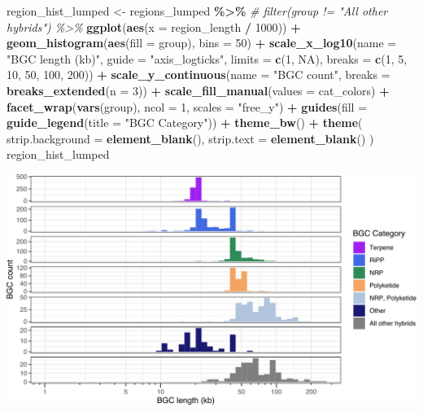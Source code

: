 \documentclass[
]{article}
\newenvironment{Shaded}{\begin{snugshade}}{\end{snugshade}}
\newcommand{\AttributeTok}[1]{\textcolor[rgb]{0.13,0.29,0.53}{#1}}
\newcommand{\CommentTok}[1]{\textcolor[rgb]{0.56,0.35,0.01}{\textit{#1}}}
\newcommand{\ConstantTok}[1]{\textcolor[rgb]{0.56,0.35,0.01}{#1}}
\newcommand{\DecValTok}[1]{\textcolor[rgb]{0.00,0.00,0.81}{#1}}
\newcommand{\FunctionTok}[1]{\textcolor[rgb]{0.13,0.29,0.53}{\textbf{#1}}}
\newcommand{\NormalTok}[1]{#1}
\newcommand{\OtherTok}[1]{\textcolor[rgb]{0.56,0.35,0.01}{#1}}
\newcommand{\SpecialCharTok}[1]{\textcolor[rgb]{0.81,0.36,0.00}{\textbf{#1}}}
\newcommand{\StringTok}[1]{\textcolor[rgb]{0.31,0.60,0.02}{#1}}
\begin{document}
\begin{Shaded}
\begin{Highlighting}[]
\NormalTok{region\_hist\_lumped }\OtherTok{\textless{}{-}}\NormalTok{ regions\_lumped }\SpecialCharTok{\%\textgreater{}\%}
  \CommentTok{\# filter(group != "All other hybrids") \%\textgreater{}\%}
  \FunctionTok{ggplot}\NormalTok{(}\FunctionTok{aes}\NormalTok{(}\AttributeTok{x =}\NormalTok{ region\_length }\SpecialCharTok{/} \DecValTok{1000}\NormalTok{)) }\SpecialCharTok{+}
  \FunctionTok{geom\_histogram}\NormalTok{(}\FunctionTok{aes}\NormalTok{(}\AttributeTok{fill =}\NormalTok{ group), }\AttributeTok{bins =} \DecValTok{50}\NormalTok{) }\SpecialCharTok{+}
  \FunctionTok{scale\_x\_log10}\NormalTok{(}\AttributeTok{name =} \StringTok{"BGC length (kb)"}\NormalTok{, }\AttributeTok{guide =} \StringTok{"axis\_logticks"}\NormalTok{, }\AttributeTok{limits =} \FunctionTok{c}\NormalTok{(}\DecValTok{1}\NormalTok{, }\ConstantTok{NA}\NormalTok{), }\AttributeTok{breaks =} \FunctionTok{c}\NormalTok{(}\DecValTok{1}\NormalTok{, }\DecValTok{5}\NormalTok{, }\DecValTok{10}\NormalTok{, }\DecValTok{50}\NormalTok{, }\DecValTok{100}\NormalTok{, }\DecValTok{200}\NormalTok{)) }\SpecialCharTok{+}
  \FunctionTok{scale\_y\_continuous}\NormalTok{(}\AttributeTok{name =} \StringTok{"BGC count"}\NormalTok{, }\AttributeTok{breaks =} \FunctionTok{breaks\_extended}\NormalTok{(}\AttributeTok{n =} \DecValTok{3}\NormalTok{)) }\SpecialCharTok{+}
  \FunctionTok{scale\_fill\_manual}\NormalTok{(}\AttributeTok{values =}\NormalTok{ cat\_colors) }\SpecialCharTok{+}
  \FunctionTok{facet\_wrap}\NormalTok{(}\FunctionTok{vars}\NormalTok{(group), }\AttributeTok{ncol =} \DecValTok{1}\NormalTok{, }\AttributeTok{scales =} \StringTok{"free\_y"}\NormalTok{) }\SpecialCharTok{+}
  \FunctionTok{guides}\NormalTok{(}\AttributeTok{fill =} \FunctionTok{guide\_legend}\NormalTok{(}\AttributeTok{title =} \StringTok{"BGC Category"}\NormalTok{)) }\SpecialCharTok{+}
  \FunctionTok{theme\_bw}\NormalTok{() }\SpecialCharTok{+}
  \FunctionTok{theme}\NormalTok{(}
    \AttributeTok{strip.background =} \FunctionTok{element\_blank}\NormalTok{(),}
    \AttributeTok{strip.text =} \FunctionTok{element\_blank}\NormalTok{()}
\NormalTok{  )}
\NormalTok{region\_hist\_lumped}
\end{Highlighting}
\end{Shaded}

\includegraphics{analysis_files/figure-latex/unnamed-chunk-11-1.pdf}
\end{document}
